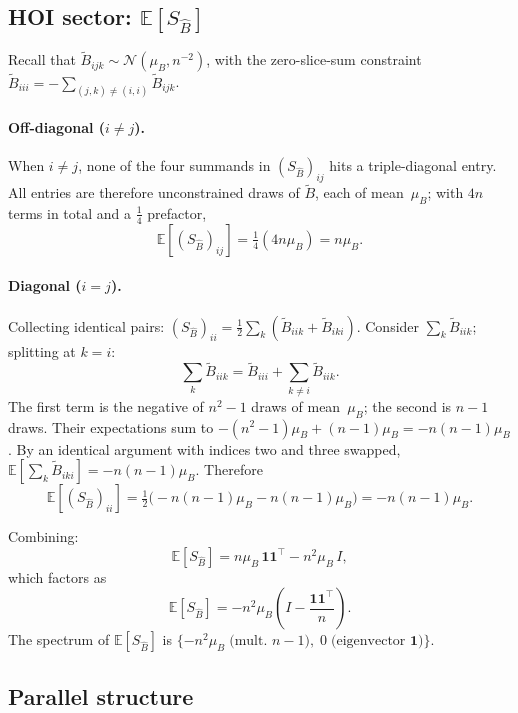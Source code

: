 \documentclass[pdflatex,sn-mathphys-num]{sn-jnl}%
\begin{document}
\begin{appendices}
\subsection*{HOI sector: $\mathbb{E}[S_{\hat{B}}]$}

Recall that $\tilde{B}_{ijk} \sim \mathcal{N}(\mu_B, n^{-2})$, with the zero-slice-sum constraint $\tilde{B}_{iii} = -\sum_{(j,k) \neq (i,i)} \tilde{B}_{ijk}$.

\paragraph{Off-diagonal ($i \neq j$).} When $i \neq j$, none of the four summands in $(S_{\hat{B}})_{ij}$ hits a triple-diagonal entry. All entries are therefore unconstrained draws of $\tilde{B}$, each of mean~$\mu_B$; with $4n$ terms in total and a $\tfrac{1}{4}$ prefactor,
\[
\mathbb{E}[(S_{\hat{B}})_{ij}] = \tfrac{1}{4}(4n\mu_B) = n\mu_B.
\]

\paragraph{Diagonal ($i = j$).} Collecting identical pairs: $(S_{\hat{B}})_{ii} = \tfrac{1}{2}\sum_k(\tilde{B}_{iik} + \tilde{B}_{iki})$. Consider $\sum_k \tilde{B}_{iik}$; splitting at $k = i$:
\[
\sum_k \tilde{B}_{iik} = \tilde{B}_{iii} + \sum_{k \neq i} \tilde{B}_{iik}.
\]
The first term is the negative of $n^2 - 1$ draws of mean~$\mu_B$; the second is $n-1$ draws. Their expectations sum to $-(n^2 - 1)\mu_B + (n-1)\mu_B = -n(n-1)\mu_B$. By an identical argument with indices two and three swapped, $\mathbb{E}[\sum_k \tilde{B}_{iki}] = -n(n-1)\mu_B$. Therefore
\[
\mathbb{E}[(S_{\hat{B}})_{ii}] = \tfrac{1}{2}\bigl(-n(n-1)\mu_B - n(n-1)\mu_B\bigr) = -n(n-1)\mu_B.
\]

Combining:
\[
\mathbb{E}[S_{\hat{B}}] = n\mu_B\,\mathbf{1}\mathbf{1}^\top - n^2\mu_B\,I,
\]
which factors as
\begin{equation}\label{eq:mean_SB}
\mathbb{E}[S_{\hat{B}}] = -n^2\mu_B\!\left(I - \frac{\mathbf{1}\mathbf{1}^\top}{n}\right).
\end{equation}
The spectrum of $\mathbb{E}[S_{\hat{B}}]$ is $\{-n^2\mu_B\;\text{(mult.\ }n{-}1),\;0\;\text{(eigenvector~}\mathbf{1})\}$.

\subsection*{Parallel structure}


\end{appendices}
\end{document}
